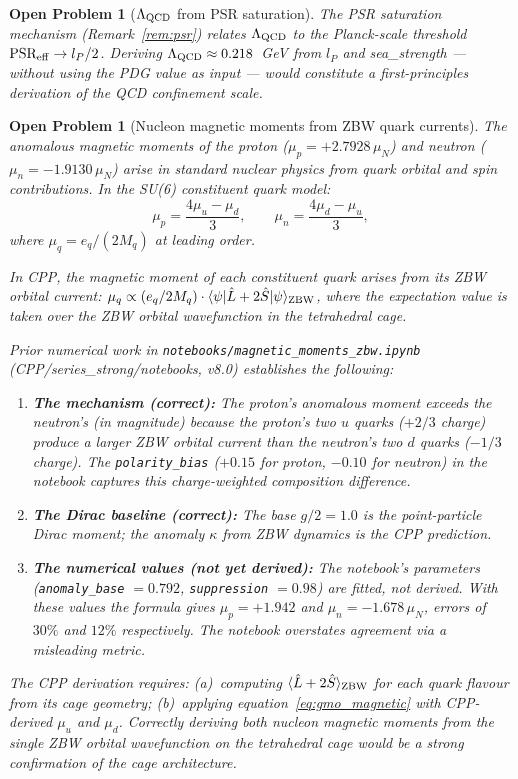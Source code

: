 \documentclass[11pt,a4paper]{article}
\newtheorem{openprob}[theorem]{Open Problem}
\newcommand{\lP}{l_P}
\begin{document}
\begin{openprob}[$\Lambda_{\rm QCD}$ from PSR saturation]
\label{op:lambda_psr}
The PSR saturation mechanism (Remark~\ref{rem:psr}) relates
$\Lambda_{\rm QCD}$ to the Planck-scale threshold
$\text{PSR}_{\rm eff} \to \lP/2$.  Deriving $\Lambda_{\rm QCD}
\approx 0.218$~GeV from $\lP$ and sea\_strength --- without
using the PDG value as input --- would constitute a first-principles
derivation of the QCD confinement scale.
\end{openprob}

\begin{openprob}[Nucleon magnetic moments from ZBW quark currents]
\label{op:mag_moments}
The anomalous magnetic moments of the proton ($\mu_p = +2.7928\,\mu_N$)
and neutron ($\mu_n = -1.9130\,\mu_N$) arise in standard nuclear
physics from quark orbital and spin contributions.  In the SU(6)
constituent quark model:
\begin{equation}
\mu_p = \frac{4\mu_u - \mu_d}{3}, \qquad
\mu_n = \frac{4\mu_d - \mu_u}{3},
\label{eq:gmo_magnetic}
\end{equation}
where $\mu_q = e_q / (2 M_q)$ at leading order.

In CPP, the magnetic moment of each constituent quark arises from its
ZBW orbital current: $\mu_q \propto (e_q / 2 M_q) \cdot
\langle\psi|\hat{L} + 2\hat{S}|\psi\rangle_{\rm ZBW}$, where the
expectation value is taken over the ZBW orbital wavefunction in the
tetrahedral cage.

Prior numerical work in \texttt{notebooks/magnetic\_moments\_zbw.ipynb}
(CPP/series\_strong/notebooks, v8.0) establishes the following:
\begin{enumerate}
\item \textbf{The mechanism (correct):} The proton's anomalous moment
  exceeds the neutron's (in magnitude) because the proton's two $u$
  quarks ($+2/3$ charge) produce a larger ZBW orbital current than
  the neutron's two $d$ quarks ($-1/3$ charge).  The
  \texttt{polarity\_bias} ($+0.15$ for proton, $-0.10$ for neutron)
  in the notebook captures this charge-weighted composition
  difference.
\item \textbf{The Dirac baseline (correct):} The base $g/2 = 1.0$
  is the point-particle Dirac moment; the anomaly $\kappa$ from ZBW
  dynamics is the CPP prediction.
\item \textbf{The numerical values (not yet derived):}
  The notebook's parameters (\texttt{anomaly\_base} $= 0.792$,
  \texttt{suppression} $= 0.98$) are fitted, not derived.  With
  these values the formula gives $\mu_p = +1.942$ and $\mu_n =
  -1.678\,\mu_N$, errors of $30\%$ and $12\%$ respectively.
  The notebook overstates agreement via a misleading metric.
\end{enumerate}

The CPP derivation requires: (a)~computing
$\langle\hat{L}+2\hat{S}\rangle_{\rm ZBW}$ for each quark flavour
from its cage geometry; (b)~applying equation~\eqref{eq:gmo_magnetic}
with CPP-derived $\mu_u$ and $\mu_d$.  Correctly deriving both
nucleon magnetic moments from the single ZBW orbital wavefunction
on the tetrahedral cage would be a strong confirmation of the cage
architecture.
\end{openprob}
\end{document}
